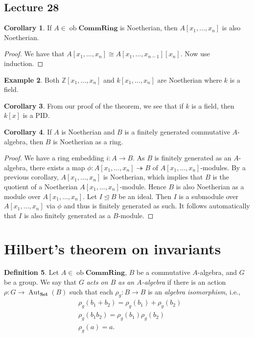 \documentclass[10pt,letterpaper,cm]{nupset}
\theoremstyle{definition}
\newtheorem{definition}{Definition}[subsection]
\newtheorem{exmp}[definition]{Example}
\theoremstyle{theorem}
\newtheorem{corollary}[definition]{Corollary}
\theoremstyle{remark}
\newcommand{\Z}{\mathbb Z}
\newcommand{\1}{\mathbf{1}}
\newcommand{\0}{\vec 0}
\DeclareMathOperator{\aut}{Aut}
\DeclareMathOperator{\ob}{ob}
\begin{document}
\subsection{Lecture 28}

\begin{corollary}
If $A \in \ob \mathbf{CommRing}$ is Noetherian, then $A[x_1, \ldots, x_n]$ is also Noetherian.
\end{corollary}
\begin{proof}
We have that $A[x_1, \ldots, x_n] \cong A[x_1, \ldots, x_{n-1}][x_n]$. Now use induction.
\end{proof}

\begin{exmp}
Both $\Z[x_1, \ldots, x_n]$ and $k[x_1, \ldots, x_n]$ are Noetherian where $k$ is a field.
\end{exmp}

\begin{corollary}
From our proof of the theorem, we see that if $k$ is a field, then $k[x]$ is a PID.
\end{corollary}

\begin{corollary}
If $A$ is Noetherian and $B$ is a finitely generated commutative $A$-algebra, then $B$ is Noetherian as a ring.
\end{corollary}
\begin{proof}
We have a ring embedding $i: A \to B$. As $B$ is finitely generated as an $A$-algebra, there exists a map $\phi: A[x_1, \ldots, x_n] \twoheadrightarrow B$ of $A[x_1, \ldots, x_n]$-modules. By a previous corollary, $A[x_1, \ldots, x_n]$ is Noetherian, which implies that $B$ is the quotient of a Noetherian $A[x_1, \ldots, x_n]$-module. Hence $B$ is also Noetherian as a module over $A[x_1, \ldots, x_n]$. Let $I\unlhd B$ be an ideal. Then $I$ is a submodule over $A[x_1, \ldots, x_n]$ via $\phi$ and thus is finitely generated as such. It follows automatically that $I$ is also finitely generated as a $B$-module.
\end{proof}

\section{Hilbert's theorem on invariants}

\begin{definition}
Let $A \in \ob \mathbf{CommRing}$, $B$ be a commutative $A$-algebra, and $G$ be a group. We say that $G$ \textit{acts on $B$ as an $A$-algebra} if there is an action $\rho : G \to \aut_{\mathbf{Set}}(B)$ such that each  $\rho_g  : B \to B$ is an \textit{algebra isomorphism}, i.e., 
\begin{align*}
&  \rho_g(b_1 +b_2) = \rho_g(b_1) + \rho_g(b_2)
\\ & \rho_g(b_1b_2) = \rho_g(b_1)\rho_g(b_2)
\\ & \rho_g(a) = a
.\end{align*}
\end{definition}
\end{document}

